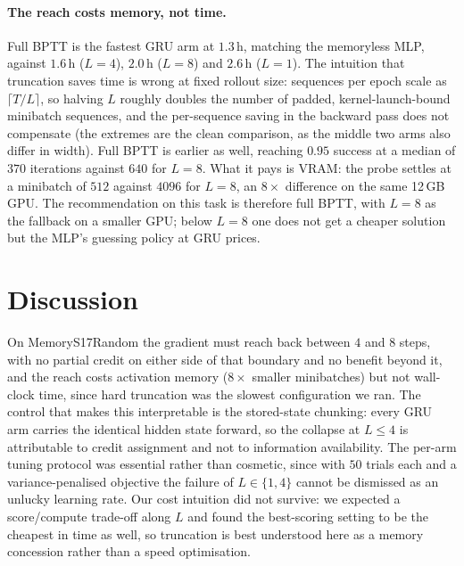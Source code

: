 \documentclass{article}
\begin{document}
\paragraph{The reach costs memory, not time.} Full BPTT is the fastest GRU arm
at $1.3$\,h, matching the memoryless MLP, against $1.6$\,h ($L=4$), $2.0$\,h
($L=8$) and $2.6$\,h ($L=1$). The intuition that truncation saves time is wrong
at fixed rollout size: sequences per epoch scale as $\lceil T/L \rceil$, so
halving $L$ roughly doubles the number of padded, kernel-launch-bound minibatch
sequences, and the per-sequence saving in the backward pass does not compensate
(the extremes are the clean comparison, as the middle two arms also differ in
width). Full BPTT is earlier as well, reaching $0.95$ success at a median of
$370$ iterations against $640$ for $L=8$. What it pays is VRAM: the probe settles
at a minibatch of $512$ against $4096$ for $L=8$, an $8\times$ difference on the
same 12\,GB GPU. The recommendation on this task is therefore full BPTT, with
$L=8$ as the fallback on a smaller GPU; below $L=8$ one does not get a cheaper
solution but the MLP's guessing policy at GRU prices.

\section{Discussion}

On MemoryS17Random the gradient must reach back between $4$ and $8$ steps, with
no partial credit on either side of that boundary and no benefit beyond it, and
the reach costs activation memory ($8\times$ smaller minibatches) but not
wall-clock time, since hard truncation was the slowest configuration we ran. The
control that makes this interpretable is the stored-state chunking: every GRU
arm carries the identical hidden state forward, so the collapse at $L \le 4$ is
attributable to credit assignment and not to information availability. The
per-arm tuning protocol was essential rather than cosmetic, since with $50$
trials each and a variance-penalised objective the failure of $L \in \{1,4\}$
cannot be dismissed as an unlucky learning rate. Our cost intuition did not
survive: we expected a score/compute trade-off along $L$ and found the
best-scoring setting to be the cheapest in time as well, so truncation is best
understood here as a memory concession rather than a speed optimisation.
\end{document}
